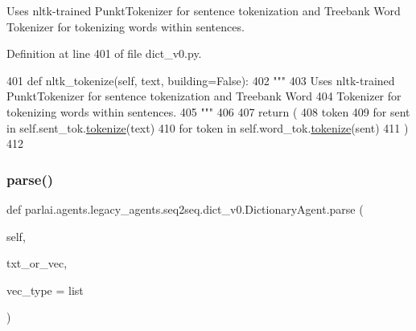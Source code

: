 \begin{DoxyVerb}Uses nltk-trained PunktTokenizer for sentence tokenization and Treebank Word
Tokenizer for tokenizing words within sentences.
\end{DoxyVerb}
 

Definition at line 401 of file dict\+\_\+v0.\+py.


\begin{DoxyCode}
401     \textcolor{keyword}{def }nltk\_tokenize(self, text, building=False):
402         \textcolor{stringliteral}{"""}
403 \textcolor{stringliteral}{        Uses nltk-trained PunktTokenizer for sentence tokenization and Treebank Word}
404 \textcolor{stringliteral}{        Tokenizer for tokenizing words within sentences.}
405 \textcolor{stringliteral}{        """}
406 
407         \textcolor{keywordflow}{return} (
408             token
409             \textcolor{keywordflow}{for} sent \textcolor{keywordflow}{in} self.sent\_tok.\hyperlink{namespaceparlai_1_1agents_1_1tfidf__retriever_1_1build__tfidf_a1fdb457e98eb4e4c26047e229686a616}{tokenize}(text)
410             \textcolor{keywordflow}{for} token \textcolor{keywordflow}{in} self.word\_tok.\hyperlink{namespaceparlai_1_1agents_1_1tfidf__retriever_1_1build__tfidf_a1fdb457e98eb4e4c26047e229686a616}{tokenize}(sent)
411         )
412 
\end{DoxyCode}
\mbox{\label{classparlai_1_1agents_1_1legacy__agents_1_1seq2seq_1_1dict__v0_1_1DictionaryAgent_a4f1667bb1484f0712678a8f679db6579}} 
\subsubsection{\texorpdfstring{parse()}{parse()}}
{\footnotesize\ttfamily def parlai.\+agents.\+legacy\+\_\+agents.\+seq2seq.\+dict\+\_\+v0.\+Dictionary\+Agent.\+parse (\begin{DoxyParamCaption}\item[{}]{self,  }\item[{}]{txt\+\_\+or\+\_\+vec,  }\item[{}]{vec\+\_\+type = {\ttfamily list} }\end{DoxyParamCaption})}

